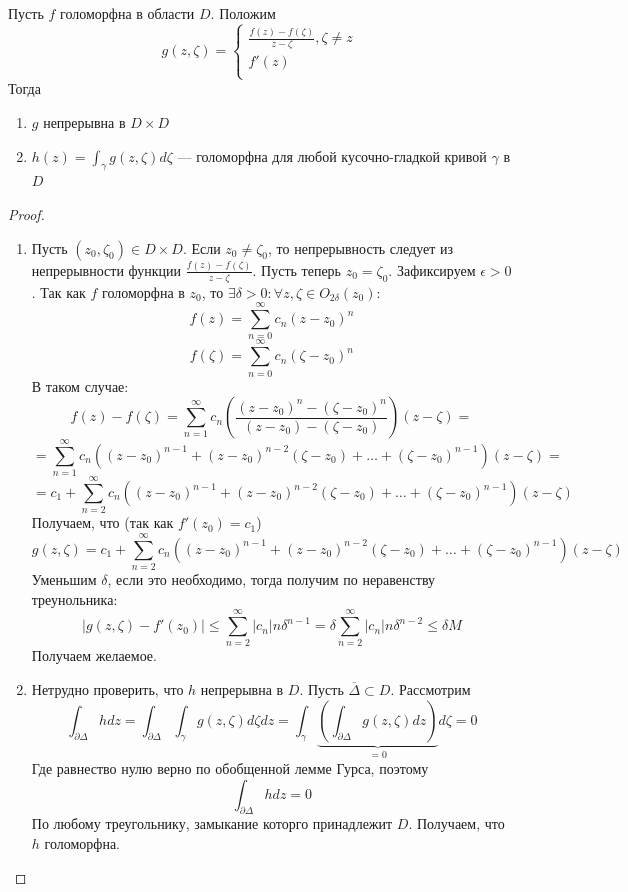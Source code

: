 \begin{lemma}
    Пусть \(f\) голоморфна в области \(D\). Положим
    \[g(z, \zeta) = \left\{\begin{array}{l}
        \frac{f(z) - f(\zeta)}{z - \zeta}, \zeta \ne z \\
        f'(z) \\
    \end{array}\right.\]
    Тогда
    \begin{enumerate}
        \item \(g\) непрерывна в \(D \times D\)
        \item \(h(z) = \int_\gamma g(z, \zeta)d\zeta\) --- голоморфна для любой кусочно-гладкой кривой \(\gamma\) в \(D\)
    \end{enumerate}
\end{lemma}
\begin{proof}
    \begin{enumerate}
        \item Пусть \((z_0, \zeta_0) \in D \times D\). Если \(z_0 \ne \zeta_0\), то непрерывность следует из непрерывности функции \(\frac{f(z) - f(\zeta)}{z - \zeta}\). Пусть теперь \(z_0 = \zeta_0\). Зафиксируем \(\epsilon > 0\). Так как \(f\) голоморфна в \(z_0\), то \(\exists \delta > 0: \forall z, \zeta \in O_{2\delta}(z_0)\):
        \[f(z) = \sum_{n = 0}^\infty c_n(z - z_0)^n\]
        \[f(\zeta) = \sum_{n = 0}^\infty c_n(\zeta - z_0)^n\]
        В таком случае:
        \[f(z) - f(\zeta) = \sum_{n = 1}^\infty c_n\left( \frac{(z - z_0)^n - (\zeta - z_0)^n}{(z - z_0) - (\zeta - z_0)} \right)(z - \zeta) = \]
        \[= \sum_{n = 1}^\infty c_n\left( (z - z_0)^{n - 1} + (z - z_0)^{n - 2}(\zeta - z_0) + \dots + (\zeta - z_0)^{n - 1} \right)(z - \zeta) =\]
        \[= c_1 + \sum_{n = 2}^\infty c_n\left( (z - z_0)^{n - 1} + (z - z_0)^{n - 2}(\zeta - z_0) + \dots + (\zeta - z_0)^{n - 1} \right)(z - \zeta)\]
        Получаем, что (так как \(f'(z_0) = c_1\))
        \[g(z, \zeta) = c_1 + \sum_{n = 2}^\infty c_n\left( (z - z_0)^{n - 1} + (z - z_0)^{n - 2}(\zeta - z_0) + \dots + (\zeta - z_0)^{n - 1} \right)(z - \zeta)\]
        Уменьшим \(\delta\), если это необходимо, тогда получим по неравенству треунольника:
        \[|g(z, \zeta) - f'(z_0)| \le \sum_{n = 2}^\infty |c_n|n\delta^{n - 1} = \delta \sum_{n = 2}^\infty |c_n|n\delta^{n - 2} \le \delta M\]
        Получаем желаемое.
        \item Нетрудно проверить, что \(h\) непрерывна в \(D\). Пусть \(\overline{\Delta} \subset D\). Рассмотрим
        \[\int_{\partial \Delta} hdz = \int_{\partial \Delta} \int_\gamma g(z, \zeta)d\zeta dz = \int_\gamma \underbrace{\left( \int_{\partial \Delta} g(z, \zeta)dz \right)}_{= 0} d\zeta = 0\]
        Где равнество нулю верно по обобщенной лемме Гурса, поэтому 
        \[\int_{\partial \Delta} hdz = 0\]
        По любому треугольнику, замыкание которго принадлежит \(D\). Получаем, что \(h\) голоморфна.
    \end{enumerate}
\end{proof}

